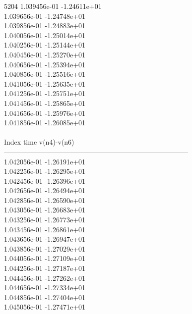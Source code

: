 5204	1.039456e-01	-1.24611e+01	\\ 	1.039656e-01	-1.24748e+01	\\ 	1.039856e-01	-1.24883e+01	\\ 	1.040056e-01	-1.25014e+01	\\ 	1.040256e-01	-1.25144e+01	\\ 	1.040456e-01	-1.25270e+01	\\ 	1.040656e-01	-1.25394e+01	\\ 	1.040856e-01	-1.25516e+01	\\ 	1.041056e-01	-1.25635e+01	\\ 	1.041256e-01	-1.25751e+01	\\ 	1.041456e-01	-1.25865e+01	\\ 	1.041656e-01	-1.25976e+01	\\ 	1.041856e-01	-1.26085e+01	\\ \hline
\\ \hline
Index   time            v(n4)-v(n6)     \\ \hline
--------------------------------------------------------------------------------\\ 	1.042056e-01	-1.26191e+01	\\ 	1.042256e-01	-1.26295e+01	\\ 	1.042456e-01	-1.26396e+01	\\ 	1.042656e-01	-1.26494e+01	\\ 	1.042856e-01	-1.26590e+01	\\ 	1.043056e-01	-1.26683e+01	\\ 	1.043256e-01	-1.26773e+01	\\ 	1.043456e-01	-1.26861e+01	\\ 	1.043656e-01	-1.26947e+01	\\ 	1.043856e-01	-1.27029e+01	\\ 	1.044056e-01	-1.27109e+01	\\ 	1.044256e-01	-1.27187e+01	\\ 	1.044456e-01	-1.27262e+01	\\ 	1.044656e-01	-1.27334e+01	\\ 	1.044856e-01	-1.27404e+01	\\ 	1.045056e-01	-1.27471e+01	\\ \hline

